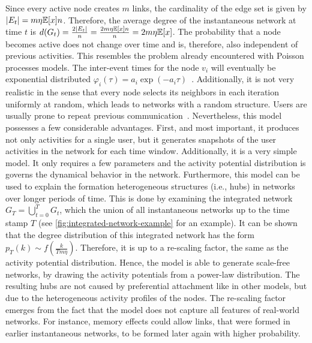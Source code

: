 Since every active node creates \(m\) links, the cardinality of the edge set is given by \(|E_{t}| = m \eta \mathbb{E}[{x}] n\).
Therefore, the average degree of the instantaneous network at time \(t\) is \(d(G_{t}) = \frac{2|E_{t}|}{n} = \frac{2 m \eta \mathbb{E}[{x}] n}{n} = 2 m \eta \mathbb{E}[{x}]\).
The probability that a node becomes active does not change over time and is, therefore, also independent of previous activities.
This resembles the problem already encountered with Poisson processes models.
The inter-event times for the node \(v_{i}\) will eventually be exponential distributed \(\varphi_{i}(\tau) = a_{i} \exp(-a_{i} \tau)\)~\cite{Moinet2016}.
Additionally, it is not very realistic in the sense that every node selects its neighbors in each iteration uniformly at random, which leads to networks with a random structure.
Users are usually prone to repeat previous communication~\cite{Karsai2014}.
Nevertheless, this model possesses a few considerable advantages.
First, and most important, it produces not only activities for a single user, but it generates snapshots of the user activities in the network for each time window.
Additionally, it is a very simple model.
It only requires a few parameters and the activity potential distribution is governs the dynamical behavior in the network.
Furthermore, this model can be used to explain the formation heterogeneous structures (i.e., hubs) in networks over longer periods of time.
This is done by examining the integrated network \(G_{T} = \bigcup_{t=0}^{T} G_{t}\), which the union of all instantaneous networks up to the time stamp \(T\) (see \autoref{fig:integrated-network-example} for an example).
It can be shown that the  degree distribution of this integrated network has the form \(p_{T}(k) \sim f(\frac{k}{T m \eta})\).
Therefore, it is up to a re-scaling factor, the same as the activity potential distribution.
Hence, the model is able to generate scale-free networks, by drawing the activity potentials from a power-law distribution.
The resulting hubs are not caused by preferential attachment like in other models, but due to the heterogeneous activity profiles of the nodes.
The re-scaling factor emerges from the fact that the model does not capture all features of real-world networks.
For instance, memory effects could allow links, that were formed in earlier instantaneous networks, to be formed later again with higher probability.


